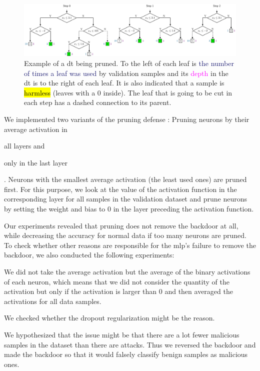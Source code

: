 \documentclass[10pt,sigconf,letterpaper,dvipsnames]{acmart}
\begin{document}
\begin{figure}[h]
\includegraphics[width=\textwidth]{pruning_example.pdf}
\caption{Example of a \gls{dt} being pruned. To the left of each leaf is \textcolor{MidnightBlue}{the number of times a leaf was used} by validation samples and its \textcolor{Fuchsia}{depth} in the \gls{dt} is to the right of each leaf. It is also indicated that a sample is \protect{} \hl{harmless} (leaves with a 0 inside). The leaf that is going to be cut in each step has a dashed connection to its parent.}
\label{fig:pruningExample}
\end{figure}


We implemented two variants of the pruning defense \cite{gu_badnets:_2017}: Pruning neurons by their average activation in \begin{enumerate*}\item all layers and \item only in the last layer \end{enumerate*}. Neurons with the smallest average activation (the least used ones) are pruned first. For this purpose, we look at the value of the activation function
in the corresponding layer for all samples in the validation dataset and prune neurons by setting the weight and bias to 0 in the layer preceding the activation function.

Our experiments revealed that pruning does not remove the backdoor at all, while decreasing the accuracy for normal data if too many neurons are pruned. To check whether other reasons are responsible for the \gls{mlp}'s failure to remove the backdoor, we also conducted the following experiments: \begin{enumerate*} \item We did not take the average activation but the average of the binary activations of each neuron, which means that we did not consider the quantity of the activation but only if the activation is larger than 0 and then averaged the activations for all data samples. \item We checked whether the dropout regularization might be the reason. \item We hypothesized that the issue might be that there are a lot fewer malicious samples in the dataset than there are attacks. Thus we reversed the backdoor and made the backdoor so that it would falsely classify benign samples as malicious ones.
\end{enumerate*}
\end{document}
